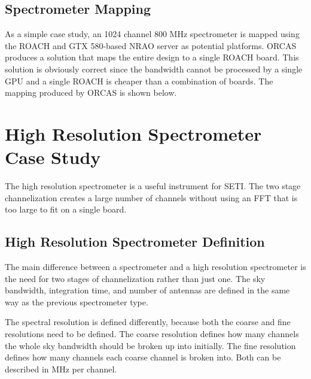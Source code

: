 

\subsection{Spectrometer Mapping}
As a simple case study, an 1024 channel 800 MHz spectrometer is mapped using the ROACH and GTX 580-based NRAO server as potential platforms. 
ORCAS produces a solution that maps the entire design to a single ROACH board.
This solution is obviously correct since the bandwidth cannot be processed by a single GPU and a single ROACH is cheaper than a combination of boards.
The mapping produced by ORCAS is shown below.


  

%
  

\section{High Resolution Spectrometer Case Study}
The high resolution spectrometer is a useful instrument for SETI. 
The two stage channelization creates a large number of channels without using an FFT that is too large to fit on a single board.


\subsection{High Resolution Spectrometer Definition}
The main difference between a spectrometer and a high resolution spectrometer is the need for two stages of channelization rather than just one. 
The sky bandwidth, integration time, and number of antennas are defined in the same way as the previous spectrometer type. 

The spectral resolution is defined differently, because both the coarse and fine resolutions need to be defined. 
The coarse resolution defines how many channels the whole sky bandwidth should be broken up into initially.
The fine resolution defines how many channels each coarse channel is broken into.
Both can be described in MHz per channel.

